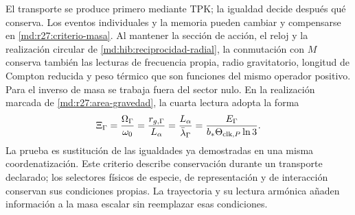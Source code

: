 El transporte se produce primero mediante TPK; la igualdad decide después
qué conserva. Los eventos individuales y la memoria pueden cambiar y
compensarse en \eqref{md:r27:criterio-masa}. Al mantener la sección de acción,
el reloj y la realización circular de \eqref{md:hib:reciprocidad-radial},
la conmutación con $M$ conserva también las lecturas de frecuencia propia,
radio gravitatorio, longitud de Compton reducida y peso térmico que son
funciones del mismo operador positivo. Para el inverso de masa se trabaja
fuera del sector nulo. En la realización marcada de
\eqref{md:r27:area-gravedad}, la cuarta lectura adopta la forma
\begin{equation}
 \Xi_\Gamma=\frac{\Omega_\Gamma}{\omega_0}
 =\frac{r_{g,\Gamma}}{L_\alpha}
 =\frac{L_\alpha}{\bar\lambda_\Gamma}
 =\frac{E_\Gamma}{b_*\Theta_{{\rm clk},P}\ln3}.
 \label{md:r27:lecturas-conservadas}
\end{equation}
La prueba es sustitución de las igualdades ya demostradas en una misma coordenatización.
Este criterio describe conservación durante un transporte declarado; los
selectores físicos de especie, de representación y de interacción conservan
sus condiciones propias. La trayectoria y su lectura armónica añaden
información a la masa escalar sin reemplazar esas condiciones.
